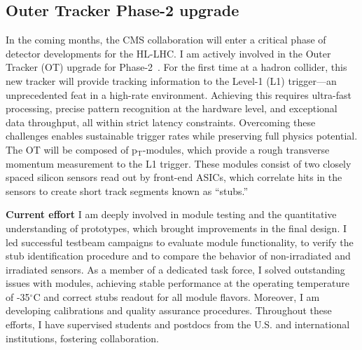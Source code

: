 {\begin{flushleft}
\subsection{Outer Tracker Phase-2 upgrade}
In the coming months, the CMS collaboration will enter a critical phase of detector developments for the HL-LHC. I am actively involved in the Outer Tracker (OT) upgrade for Phase-2~\cite{[6]}. For the first time at a hadron collider, this new tracker will provide tracking information to the Level-1 (L1) trigger—an unprecedented feat in a high-rate environment. Achieving this requires ultra-fast processing, precise pattern recognition at the hardware level, and exceptional data throughput, all within strict latency constraints. Overcoming these challenges enables sustainable trigger rates while preserving full physics potential. %
The OT will be composed of p$_{\mathrm{T}}$-modules, which provide a rough transverse momentum measurement to the L1 trigger. These modules consist of two closely spaced silicon sensors read out by front-end ASICs, which correlate hits in the sensors to create short track segments known as ``stubs.'' %

\textbf{Current effort}
I am deeply involved in module testing and the quantitative understanding of prototypes, which brought improvements in the final design. I led successful testbeam campaigns to evaluate module functionality, to verify the stub identification procedure and to compare the behavior of non-irradiated and irradiated sensors. As a member of a dedicated task force, I solved outstanding issues with modules, achieving stable performance at the operating temperature of -35$^{\circ}$C and correct stubs readout for all module flavors. Moreover, I am developing calibrations and quality assurance procedures. Throughout these efforts, I have supervised students and postdocs from the U.S. and international institutions, fostering collaboration.


\end{flushleft}}
